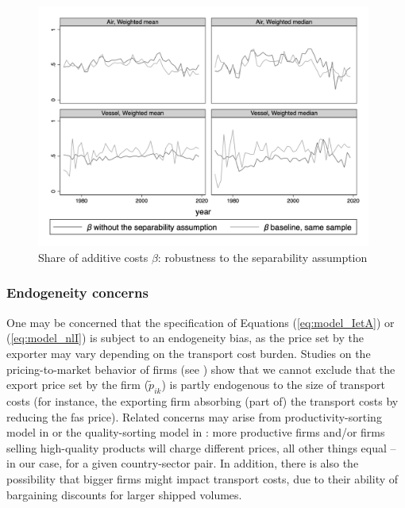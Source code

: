 \documentclass[a4paper,11pt]{article}
\begin{document}
\begin{figure}[htbp]
	\caption{Share of additive costs $\beta$: robustness to the separability assumption}
	\label{fig:comp_separability_SITC5}
	\begin{center}
		\includegraphics[height=8cm]
		{scatter_chronology_non_separe_pour_robustesse_ns.png}
	\end{center}
\end{figure}



\subsubsection{Endogeneity concerns}\label{sec:IV_main_text}

One may be concerned that the specification of Equations (\ref{eq:model_IetA}) or (\ref{eq:model_nlI}) is subject to an endogeneity bias, as the price set by the exporter may vary depending on the transport cost burden. Studies on the pricing-to-market behavior of firms (see \citealp{Krugman-87}) show that we cannot exclude that the export price set by the firm ($\widetilde{p}_{ik}$) is partly endogenous to the size of transport costs (for instance, the exporting firm absorbing (part of) the transport costs by reducing the fas price).
Related concerns may arise from productivity-sorting model in \cite{melitz} or the quality-sorting model in \cite{baldwin_harrigan}: more productive firms and/or firms selling high-quality products will charge different prices, all other things equal – in our case, for a given country-sector pair. In addition, there is also the possibility that bigger firms might impact transport costs, due to their ability of bargaining discounts for larger shipped volumes.
\end{document}
